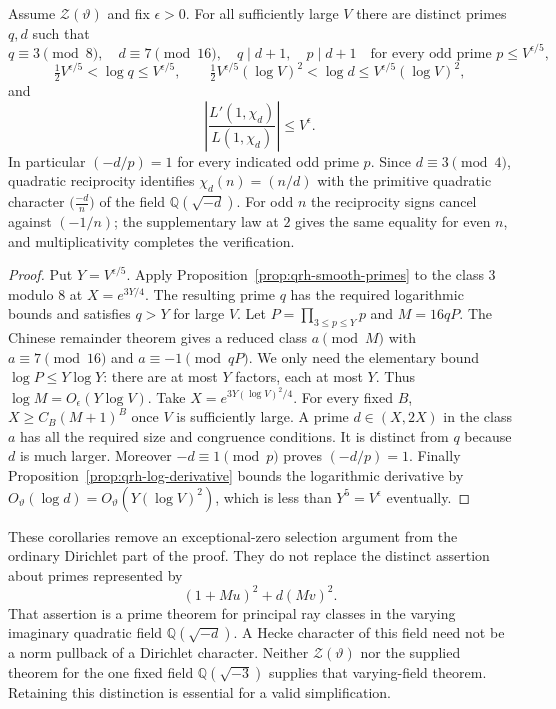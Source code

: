 \begin{corollary}
\label{cor:qrh-auxiliary-pair}
Assume $\mathcal Z(\vartheta)$ and fix $\epsilon>0$.
For all sufficiently large $V$ there are distinct primes
$q,d$ such that
\[
 q\equiv3\pmod8,\quad d\equiv7\pmod{16},\quad q\mid d+1,
 \quad p\mid d+1\quad
  \text{for every odd prime }p\le V^{\epsilon/5},
\]
\[
 \tfrac12V^{\epsilon/5}<\log q\le V^{\epsilon/5},\qquad
 \tfrac12V^{\epsilon/5}(\log V)^2<\log d
                         \le V^{\epsilon/5}(\log V)^2,
\]
and
\[
 \left|\frac{L'(1,\chi_d)}{L(1,\chi_d)}\right|
       \le V^\epsilon.
\]
In particular $(-d/p)=1$ for every indicated odd prime $p$.
Since $d\equiv3\pmod4$, quadratic reciprocity identifies
$\chi_d(n)=(n/d)$ with the primitive quadratic character
$\bigl(\frac{-d}{n}\bigr)$ of the field
$\mathbb Q(\sqrt{-d})$. For odd $n$ the reciprocity signs
cancel against $(-1/n)$; the supplementary law at $2$ gives
the same equality for even $n$, and multiplicativity completes
the verification.
\end{corollary}
\begin{proof}
Put $Y=V^{\epsilon/5}$. Apply
Proposition~\ref{prop:qrh-smooth-primes} to the class $3$
modulo $8$ at $X=e^{3Y/4}$. The resulting prime $q$
has the required logarithmic bounds and satisfies $q>Y$
for large $V$.
Let $P=\prod_{3\le p\le Y}p$ and $M=16qP$.
The Chinese remainder theorem gives a reduced class
$a\pmod M$ with $a\equiv7\pmod{16}$ and
$a\equiv-1\pmod{qP}$.
We only need the elementary bound
$\log P\le Y\log Y$: there are at most $Y$ factors,
each at most $Y$. Thus $\log M=O_\epsilon(Y\log V)$.
Take $X=e^{3Y(\log V)^2/4}$. For every fixed $B$,
$X\ge C_B(M+1)^B$ once $V$ is sufficiently large.
A prime $d\in(X,2X)$ in the class $a$ has all the
required size and congruence conditions. It is distinct
from $q$ because $d$ is much larger. Moreover
$-d\equiv1\pmod p$ proves $(-d/p)=1$.
Finally Proposition~\ref{prop:qrh-log-derivative} bounds
the logarithmic derivative by
$O_\vartheta(\log d)=O_\vartheta(Y(\log V)^2)$,
which is less than $Y^5=V^\epsilon$ eventually.
\end{proof}

These corollaries remove an exceptional-zero selection
argument from the ordinary Dirichlet part of the proof.\cite{alpo-prime-supply}
They do not replace the distinct assertion about primes
represented by
\[
 (1+Mu)^2+d(Mv)^2.
\]
That assertion is a prime theorem for principal ray classes
in the varying imaginary quadratic field
$\mathbb Q(\sqrt{-d})$. A Hecke character of this field
need not be a norm pullback of a Dirichlet character.
Neither $\mathcal Z(\vartheta)$ nor the supplied theorem
for the one fixed field $\mathbb Q(\sqrt{-3})$ supplies
that varying-field theorem. Retaining this distinction is
essential for a valid simplification.


